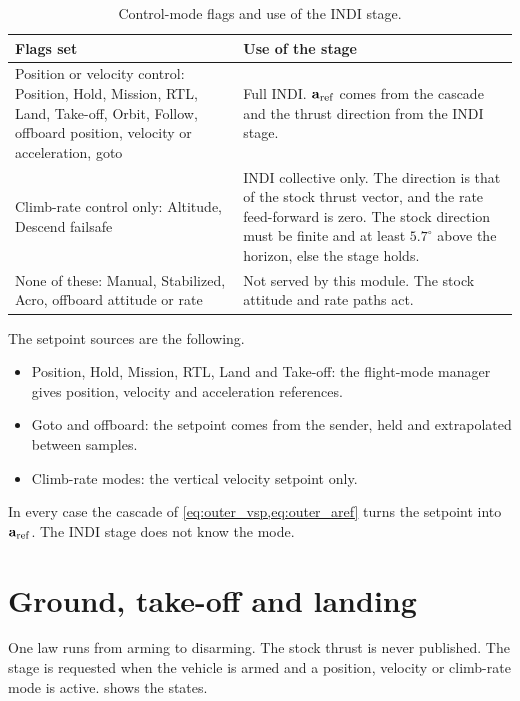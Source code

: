 \begin{table}[tbp]
\caption{Control-mode flags and use of the INDI stage.}\label{tab:outer_modes}
\centering
\small
\begin{tabularx}{\textwidth}{@{}L{5.4cm} Y@{}}
\toprule
Flags set & Use of the stage \\
\midrule
Position or velocity control: Position, Hold, Mission, RTL, Land, Take-off, Orbit, Follow, offboard position, velocity or acceleration, goto & Full INDI. $\mathbf{a}_{\mathrm{ref}}$ comes from the cascade and the thrust direction from the INDI stage. \\
Climb-rate control only: Altitude, Descend failsafe & INDI collective only. The direction is that of the stock thrust vector, and the rate feed-forward is zero. The stock direction must be finite and at least $5.7^\circ$ above the horizon, else the stage holds. \\
None of these: Manual, Stabilized, Acro, offboard attitude or rate & Not served by this module. The stock attitude and rate paths act. \\
\bottomrule
\end{tabularx}
\end{table}

The setpoint sources are the following.
\begin{itemize}
  \item Position, Hold, Mission, RTL, Land and Take-off: the flight-mode manager gives position, velocity and acceleration references.
  \item Goto and offboard: the setpoint comes from the sender, held and extrapolated between samples.
  \item Climb-rate modes: the vertical velocity setpoint only.
\end{itemize}
In every case the cascade of \cref{eq:outer_vsp,eq:outer_aref} turns the setpoint into $\mathbf{a}_{\mathrm{ref}}$.
The INDI stage does not know the mode.

\section{Ground, take-off and landing}\label{sec:outer_ground}

One law runs from arming to disarming.
The stock thrust is never published.
The stage is requested when the vehicle is armed and a position, velocity or climb-rate mode is active.
 shows the states.


